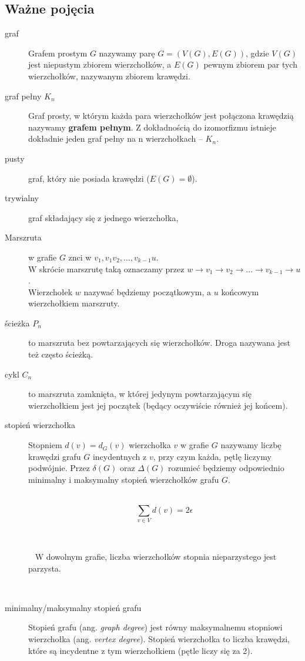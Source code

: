 \subsection{Ważne pojęcia}
\begin{description}
\item[graf] Grafem prostym $G$ nazywamy parę $G = (V (G), E(G))$, gdzie $V (G)$ jest niepustym zbiorem wierzchołków, a $E(G)$ pewnym zbiorem par tych wierzchołków, nazywanym zbiorem krawędzi.
\item[graf pełny $K_n$] Graf prosty, w którym każda para wierzchołków jest połączona krawędzią nazywamy \textbf{grafem pełnym}. Z dokładnością do izomorfizmu istnieje dokładnie jeden graf pełny na n wierzchołkach – $K_n$.
\item[pusty] graf, który nie posiada krawędzi ($E(G) = \emptyset$).
\item[trywialny] graf składający się z jednego wierzchołka,
\item[Marszruta] w grafie $G$ znci w $v_1,v_1 v_2,\ldots,v_{k-1} u$.\\
W skrócie marszrutę taką oznaczamy przez $w\to v_1\to v_2\to\ldots\to v_{k-1}\to u$.\\
Wierzchołek $w$ nazywać będziemy początkowym, a $u$ końcowym wierzchołkiem marszruty.
\item[ścieżka $P_n$] to marszruta bez powtarzających się wierzchołków. Droga nazywana jest też często ścieżką.
\item[cykl $C_n$] to marszruta zamknięta, w której jedynym powtarzającym się wierzchołkiem jest jej początek (będący oczywiście również jej końcem).
\item[stopień wierzchołka] Stopniem $d(v) = d_G(v)$ wierzchołka $v$ w grafie $G$ nazywamy liczbę krawędzi grafu $G$ incydentnych z $v$, przy czym każda, pętlę liczymy podwójnie. Przez $\delta (G)$ oraz $\Delta (G)$ rozumieć będziemy odpowiednio minimalny i maksymalny stopień wierzchołków grafu $G$.
\begin{theorem}~ %
$$\sum _{v\in V}d(v)=2\epsilon$$
\end{theorem}~ %
\begin{remark}~ %
W dowolnym grafie, liczba wierzchołków stopnia nieparzystego jest parzysta.
\end{remark}~ %
\item[minimalny/maksymalny stopień grafu] Stopień grafu (ang. \textit{graph degree}) jest równy maksymalnemu stopniowi wierzchołka (ang. \textit{vertex degree}). Stopień wierzchołka to liczba krawędzi, które są incydentne z tym wierzchołkiem (pętle liczy się za 2).\\

\end{description}
